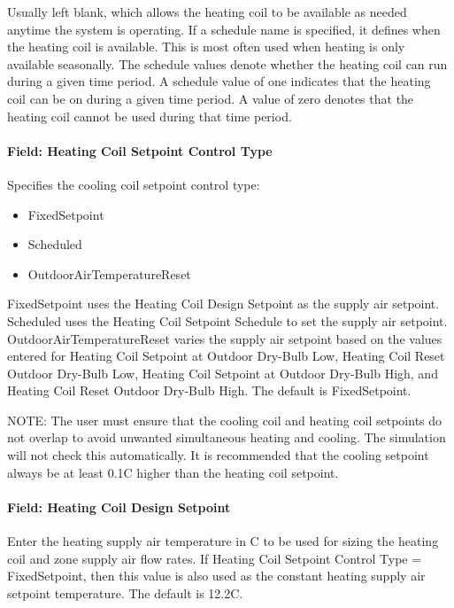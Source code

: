 Usually left blank, which allows the heating coil to be available as needed anytime the system is operating. If a schedule name is specified, it defines when the heating coil is available. This is most often used when heating is only available seasonally. The schedule values denote whether the heating coil can run during a given time period. A schedule value of one indicates that the heating coil can be on during a given time period. A value of zero denotes that the heating coil cannot be used during that time period.

\paragraph{Field: Heating Coil Setpoint Control Type}\label{field-heating-coil-setpoint-control-type-2}

Specifies the cooling coil setpoint control type:

\begin{itemize}
\item
  FixedSetpoint
\item
  Scheduled
\item
  OutdoorAirTemperatureReset
\end{itemize}

FixedSetpoint uses the Heating Coil Design Setpoint as the supply air setpoint. Scheduled uses the Heating Coil Setpoint Schedule to set the supply air setpoint. OutdoorAirTemperatureReset varies the supply air setpoint based on the values entered for Heating Coil Setpoint at Outdoor Dry-Bulb Low, Heating Coil Reset Outdoor Dry-Bulb Low, Heating Coil Setpoint at Outdoor Dry-Bulb High, and Heating Coil Reset Outdoor Dry-Bulb High. The default is FixedSetpoint.

NOTE: The user must ensure that the cooling coil and heating coil setpoints do not overlap to avoid unwanted simultaneous heating and cooling. The simulation will not check this automatically. It is recommended that the cooling setpoint always be at least 0.1C higher than the heating coil setpoint.

\paragraph{Field: Heating Coil Design Setpoint}\label{field-heating-coil-design-setpoint-5}

Enter the heating supply air temperature in C to be used for sizing the heating coil and zone supply air flow rates. If Heating Coil Setpoint Control Type = FixedSetpoint, then this value is also used as the constant heating supply air setpoint temperature. The default is 12.2C.

